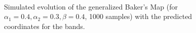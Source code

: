 \documentclass[11pt,titlepage]{article}
\begin{document}
\newpage
\begin{center}
	\begin{figure} [h]
		\centering
		\hspace{8mm}
		\\
		\centering
		\hspace{8mm}
		\caption{Simulated evolution of the generalized Baker's Map (for $\alpha_1=0.4, \alpha_2=0.3, \beta=0.4$, 1000 samples) with the predicted coordinates for the bands.}
		\label{fig16}
	\end{figure}
\end{center}
\end{document}
